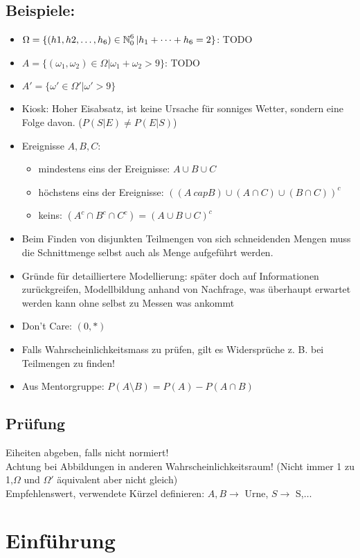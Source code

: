 \documentclass[german]{latex4ei/latex4ei_sheet}
\begin{document}
\subsection*{Beispiele:}
\begin{itemize}
	\item $\Omega=\{(h1,h2,\ldots,h_6) \in \operatorname{\mathbb N}_0^6 | h_1+ \cdots +h_6=2 \}$: TODO
	\item $A=\{(\omega_1,\omega_2) \in \Omega | \omega_1 + \omega_2 >9\}$: TODO
	\item $A'=\{\omega' \in \Omega' | \omega'>9\}$
	\item Kiosk: Hoher Eisabsatz, ist keine Ursache f\"ur sonniges Wetter, sondern eine Folge davon. ($P(S|E)\neq P(E|S)$)
	\item Ereignisse $A,B,C$:
		\begin{itemize}
			\item mindestens eins der Ereignisse: $A \cup B \cup C$
			\item h\"ochstens eins der Ereignisse: ${((A\ cap B) \cup (A \cap C) \cup (B \cap C))}^{c}$
			\item keins: $(A^c\cap B^c \cap C^c)={(A \cup B \cup C)}^c$
		\end{itemize}
	\item Beim Finden von disjunkten Teilmengen von sich schneidenden Mengen muss die Schnittmenge selbst auch als Menge aufgef\"uhrt werden.
	\item Gr\"unde f\"ur detailliertere Modellierung: sp\"ater doch auf Informationen zur\"uckgreifen, Modellbildung anhand von Nachfrage, was \"uberhaupt erwartet werden kann ohne selbst zu Messen was ankommt
	\item Don't Care: $(0,*)$
	\item Falls Wahrscheinlichkeitsmass zu pr\"ufen, gilt es Widerspr\"uche z. B. bei Teilmengen zu finden!
	\item Aus Mentorgruppe: $P(A \setminus B)=P(A)-P(A \cap B)$
\end{itemize}
\subsection*{Pr\"ufung}
Eiheiten abgeben, falls nicht normiert!\\
Achtung bei Abbildungen in anderen Wahrscheinlichkeitsraum! (Nicht immer 1 zu 1,$\Omega$ und $\Omega'$ \"aquivalent aber nicht gleich)\\
Empfehlenswert, verwendete K\"urzel definieren: $A,B \rightarrow $ Urne, $S \rightarrow $ S,$\dots$
\section{Einf\"uhrung}
\end{document}

